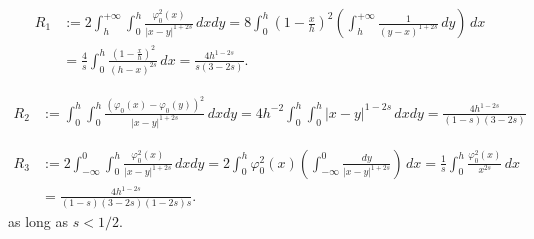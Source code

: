 \documentclass[11 pt]{article}
\numberwithin{equation}{section}
\begin{document}

\begin{align*}
	R_1 &:= 2\int_{h}^{+\infty}\int_{0}^{h} \frac{\varphi_0^2(x)}{|x-y|^{1+2s}}\,dxdy = 8\int_{0}^{h}\left(1-\frac{x}{h}\right)^2\left(\int_{h}^{+\infty} \frac{1}{(y-x)^{1+2s}}\, dy\right)\,dx \\
	&= \frac{4}{s}\int_{0}^{h}\frac{\left(1-\frac{x}{h}\right)^2}{(h-x)^{2s}}\,dx
	=\frac{4h^{1-2 s}}{s(3-2 s)}.
\end{align*}

\begin{align*}
	R_2 &
	:= \int_{0}^{h}\int_{0}^{h} \frac{(\varphi_0(x)-\varphi_0(y))^2}{|x-y|^{1+2s}}\,dxdy
	= 4h^{-2}\int_{0}^{h}\int_{0}^{h} |x-y|^{1-2s}\,dxdy
	=\frac{4h^{1-2 s}}{(1-s) (3-2 s)}
\end{align*}



\begin{align*}
	R_3 &:= 2\int_{-\infty}^{0}\int_{0}^{h} \frac{\varphi_0^2(x)}{|x-y|^{1+2s}}\,dxdy = 2\int_{0}^{h}\varphi_0^2(x)\left(\int_{-\infty}^{0} \frac{dy}{|x-y|^{1+2s}}\right)\,dx = \frac{1}{s}\int_{0}^{h}\frac{\varphi_0^2(x)}{x^{2s}}\,dx\\
	&=\frac{4 h^{1-2 s}}{(1-s)(3-2 s) (1-2 s)s}.
\end{align*}
%
as long as $s<1/2$.
\end{document}
